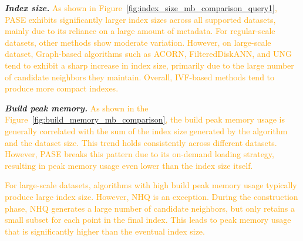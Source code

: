 \documentclass[sigconf, nonacm]{acmart}
\begin{document}
\textit{\textbf{Index size.}}
\textcolor{orange}{
	As shown in Figure~\ref{fig:index_size_mb_comparison_query1}, PASE exhibits significantly larger index sizes across all supported datasets, mainly due to its reliance on a large amount of metadata. For regular-scale datasets, other methods show moderate variation. However, on large-scale dataset, Graph-based algorithms such as ACORN, FilteredDiskANN, and UNG tend to exhibit a sharp increase in index size, primarily due to the large number of candidate neighbors they maintain. Overall, IVF-based methods tend to produce more compact indexes.
}






\textit{\textbf{Build peak memory.}}
% 
\textcolor{orange}{As shown in the Figure~\ref{fig:build_memory_mb_comparison}, the build peak memory usage is generally correlated with the sum of the index size generated by the algorithm and the dataset size. This trend holds consistently across different datasets. However, PASE breaks this pattern due to its on-demand loading strategy, resulting in peak memory usage even lower than the index size itself. }
	
\textcolor{orange}{For large-scale datasets, algorithms with high build peak memory usage typically produce large index size. However, NHQ is an exception. During the construction phase, NHQ generates a large number of candidate neighbors, but only retains a small subset for each point in the final index. This leads to peak memory usage that is significantly higher than the eventual index size.}
\end{document}
